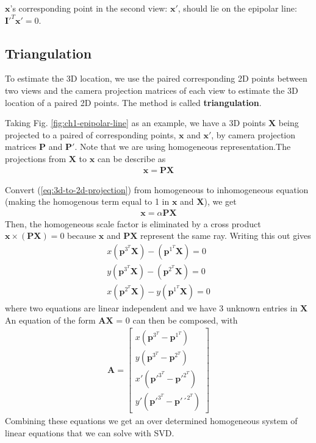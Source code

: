 $\mathbf{x}$'s corresponding point in the second view: $\mathbf{x'}$, should lie on the epipolar line: $\mathbf{I'}^T\mathbf{x'} = 0$.

\subsection{Triangulation}
To estimate the 3D location, we use the paired corresponding 2D points between two views and the camera projection matrices of each view to estimate the 3D location of a paired 2D points. The method is called \textbf{triangulation}.

Taking Fig. \ref{fig:ch1-epipolar-line} as an example, we have a 3D points $\mathbf{X}$ being projected to a paired of corresponding points, $\mathbf{x}$ and $\mathbf{x'}$, by camera projection matrices $\mathbf{P}$ and $\mathbf{P'}$. Note that we are using homogeneous representation.The projections from $\mathbf{X}$ to $\mathbf{x}$ can be describe as
\begin{gather}
	\mathbf{x} = \mathbf{P}\mathbf{X}
	\label{eq:3d-to-2d-projection}
\end{gather}

Convert (\ref{eq:3d-to-2d-projection}) from homogeneous to inhomogeneous equation (making the homogenous term equal to 1 in $\mathbf{x}$ and $\mathbf{X}$), we get
\begin{gather}
\mathbf{x} = \alpha\mathbf{P}\mathbf{X}
\end{gather}
Then, the homogeneous scale factor is eliminated by a cross product $\mathbf{x} \times (\mathbf{P}\mathbf{X}) = 0$ because $\mathbf{x}$ and $\mathbf{PX}$ represent the same ray. Writing this out gives
\begin{equation}
	\begin{gathered}
	x(\mathbf{p}^{3^T}\mathbf{X}) -(\mathbf{p}^{1^T}\mathbf{X}) = 0 \\
	y(\mathbf{p}^{3^T}\mathbf{X}) -(\mathbf{p}^{2^T}\mathbf{X}) = 0 \\
	x(\mathbf{p}^{2^T}\mathbf{X}) -y(\mathbf{p}^{1^T}\mathbf{X}) = 0
	\end{gathered}
\end{equation}
where two equations are linear independent and we have 3 unknown entries in $\mathbf{X}$
An equation of the form  $\mathbf{AX}$ = 0 can then be composed, with
\begin{gather}\label{eq:dlt}
\mathbf{A}
=
\begin{bmatrix}
x(\mathbf{p}^{3^T} -\mathbf{p}^{1^T}) \\
y(\mathbf{p}^{3^T} -\mathbf{p}^{2^T}) \\
x'(\mathbf{p'}^{3^T} -\mathbf{p'}^{2^T}) \\
y'(\mathbf{p'}^{3^T} -\mathbf{p'´}^{2^T})
\end{bmatrix}
\end{gather}
Combining these equations we get an over determined homogeneous system of linear equations that we can solve with SVD.




